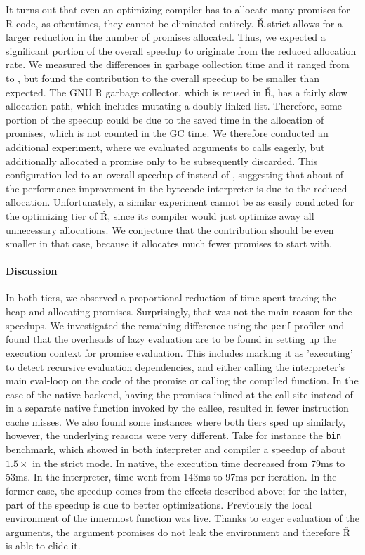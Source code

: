 \documentclass[review,nonacm,screen,acmsmall,anonymous=true]{acmart}
\renewcommand{\Rsh}{{\sf\v R}\xspace}
\newcommand{\Rshstrict}{{\sf\v R-strict}\xspace}
\begin{document}
It turns out that even an optimizing compiler has to allocate many promises for R
code, as oftentimes, they cannot be eliminated entirely. \Rshstrict allows for
a larger reduction in the number of promises allocated.
Thus, we expected a significant portion of the overall speedup to originate from
the reduced allocation rate. We measured the differences in garbage collection
time and it ranged from \speedupGCRshStrictMin to \speedupGCRshStrictMax, but
found the contribution to the overall speedup to be smaller than expected.
The GNU R garbage collector, which is reused in \Rsh, has a fairly slow allocation path, which
includes mutating a doubly-linked list. Therefore, some portion of the speedup
could be due to the saved time in the allocation of promises, which is not counted in the GC time.
We therefore conducted an additional experiment, where we evaluated arguments to
calls eagerly, but additionally allocated a promise only to be subsequently discarded.
This configuration led to an overall speedup of
\speedupBCRshStrictAlloc instead of \speedupBCRshStrict, suggesting that
about \speedupDueToReducedGC of the performance improvement in the bytecode interpreter is due to the
reduced allocation. Unfortunately, a similar experiment cannot be as easily conducted
for the optimizing tier of \Rsh, since its compiler would just optimize away all
unnecessary allocations. We conjecture that the contribution should be even
smaller in that case, because it allocates much fewer promises to start with.

\paragraph{Discussion}

In both tiers, we observed a proportional reduction of time spent tracing the
heap and allocating promises. Surprisingly, that was not the main reason
for the speedups. We investigated the remaining difference using the
\lstinline{perf} profiler and found that the overheads of lazy evaluation are to
be found in setting up the execution context for promise evaluation. This
includes marking it as 'executing' to detect recursive evaluation dependencies,
and either calling the interpreter's main eval-loop on the code of the promise or
calling the compiled function. In the case of the native backend, having the
promises inlined at the call-site instead of in a separate native function
invoked by the callee, resulted in fewer instruction cache misses. We also found
some instances where both tiers sped up similarly, however, the underlying
reasons were very different. Take for instance the \lstinline{bin} benchmark,
which showed in both interpreter and compiler a speedup of about $1.5\times$ in
the strict mode. In native, the execution time decreased from 79ms to 53ms. In
the interpreter, time went from 143ms to 97ms per iteration. In the former case,
the speedup comes from the effects described above; for the latter, part of the
speedup is due to better optimizations. Previously the local environment of
the innermost function was live. Thanks to eager evaluation of the arguments,
the argument promises do not leak the environment and therefore \Rsh is able to
elide it.
\end{document}
